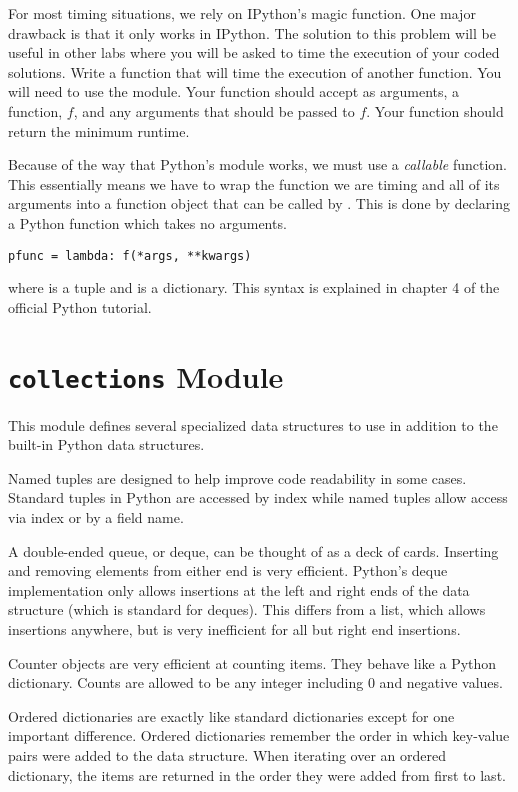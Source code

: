 \begin{problem}
For most timing situations, we rely on IPython's  magic function.
One major drawback is that it only works in IPython.
The solution to this problem will be useful in other labs where you will be asked to time the execution of your coded solutions.
Write a function that will time the execution of another function.
You will need to use the  module.
Your function should accept as arguments, a function, $f$, and any arguments that should be passed to $f$.
Your function should return the minimum runtime.

Because of the way that Python's  module works, we must use a \emph{callable} function.
This essentially means we have to wrap the function we are timing and all of its arguments into a function object that can be called by .
This is done by declaring a Python  function which takes no arguments.
\begin{lstlisting}
pfunc = lambda: f(*args, **kwargs)
\end{lstlisting}
where  is a tuple and  is a dictionary.
This syntax is explained in chapter 4 of the official Python tutorial.
\end{problem}

\section*{\texttt{collections} Module}
This module defines several specialized data structures to use in addition to the built-in Python data structures.

Named tuples are designed to help improve code readability in some cases.
Standard tuples in Python are accessed by index while named tuples allow access via index or by a field name.

A double-ended queue, or deque, can be thought of as a deck of cards.
Inserting and removing elements from either end is very efficient.
Python's deque implementation only allows insertions at the left and right ends of the data structure (which is standard for deques).
This differs from a list, which allows insertions anywhere, but is very inefficient for all but right end insertions.
 
Counter objects are very efficient at counting items.  They behave like a Python dictionary.  Counts are allowed to be any integer including 0 and negative values.
 
Ordered dictionaries are exactly like standard dictionaries except for one important difference.
Ordered dictionaries remember the order in which key-value pairs were added to the data structure.
When iterating over an ordered dictionary, the items are returned in the order they were added from first to last.

